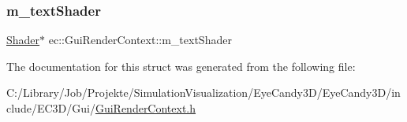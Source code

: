 \mbox{\label{structec_1_1_gui_render_context_aa42aa86b9e3f12b973329494a3c89f90}} 
\subsubsection{\texorpdfstring{m\+\_\+text\+Shader}{m\_textShader}}
{\footnotesize\ttfamily \mbox{\hyperlink{classec_1_1_shader}{Shader}}$\ast$ ec\+::\+Gui\+Render\+Context\+::m\+\_\+text\+Shader}



The documentation for this struct was generated from the following file\+:\begin{DoxyCompactItemize}
\item 
C\+:/\+Library/\+Job/\+Projekte/\+Simulation\+Visualization/\+Eye\+Candy3\+D/\+Eye\+Candy3\+D/include/\+E\+C3\+D/\+Gui/\mbox{\hyperlink{_gui_render_context_8h}{Gui\+Render\+Context.\+h}}\end{DoxyCompactItemize}
